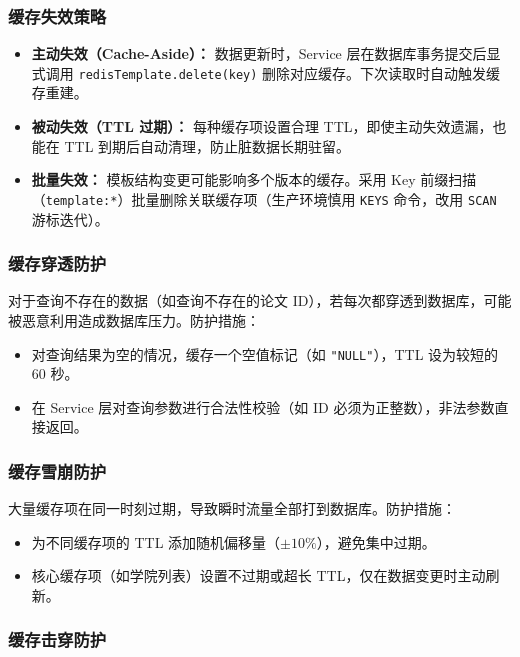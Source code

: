 \subsubsection{缓存失效策略}

\begin{itemize}
    \item \textbf{主动失效（Cache-Aside）：} 数据更新时，Service 层在数据库事务提交后显式调用 \texttt{redisTemplate.delete(key)} 删除对应缓存。下次读取时自动触发缓存重建。
    \item \textbf{被动失效（TTL 过期）：} 每种缓存项设置合理 TTL，即使主动失效遗漏，也能在 TTL 到期后自动清理，防止脏数据长期驻留。
    \item \textbf{批量失效：} 模板结构变更可能影响多个版本的缓存。采用 Key 前缀扫描（\texttt{template:*}）批量删除关联缓存项（生产环境慎用 \texttt{KEYS} 命令，改用 \texttt{SCAN} 游标迭代）。
\end{itemize}

\subsubsection{缓存穿透防护}

对于查询不存在的数据（如查询不存在的论文 ID），若每次都穿透到数据库，可能被恶意利用造成数据库压力。防护措施：
\begin{itemize}
    \item 对查询结果为空的情况，缓存一个空值标记（如 \texttt{"NULL"}），TTL 设为较短的 60 秒。
    \item 在 Service 层对查询参数进行合法性校验（如 ID 必须为正整数），非法参数直接返回。
\end{itemize}

\subsubsection{缓存雪崩防护}

大量缓存项在同一时刻过期，导致瞬时流量全部打到数据库。防护措施：
\begin{itemize}
    \item 为不同缓存项的 TTL 添加随机偏移量（$\pm 10\%$），避免集中过期。
    \item 核心缓存项（如学院列表）设置不过期或超长 TTL，仅在数据变更时主动刷新。
\end{itemize}

\subsubsection{缓存击穿防护}

